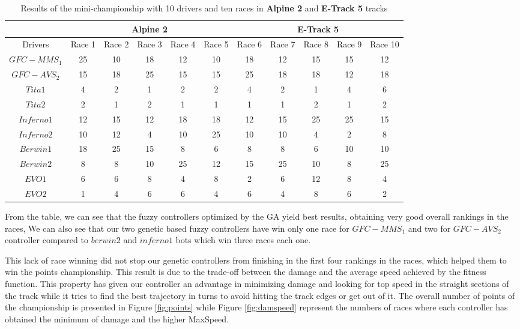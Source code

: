\documentclass[conference]{IEEEtran}
\begin{document}
\begin{table}[ht]
  \centering
  {\scriptsize
    \caption{ Results of the mini-championship with 10 drivers and ten races in \textbf{Alpine 2} and \textbf{E-Track 5} tracks }
    {
			\begin{tabular}{|c||c|c|c|c|c|c|c|c|c|c||}
				\hline
			&\multicolumn{5}{|c|}{\textbf{Alpine 2}} &	\multicolumn{5}{|c|}{\textbf{E-Track 5}}\\
				\hline
				\hline	
				Drivers&{Race 1}&{Race 2}&{Race 3}&{Race 4}&{Race 5}&{Race 6}&{Race 7}&{Race 8}&{Race 9}&{Race 10}\\
				\hline	\hline			
				$GFC-MMS_1$&	25&	10&	18&	12&	10&	18&	12&	15&	15&	12\\
				$GFC-AVS_2$&	15&	18&	25&	15&	15&	25&	18&	18&	12&18\\
				$Tita1$&	4&	2&	1&	2&	2&	4&	2&	1&	4&	6\\
				$Tita2$&	2&	1&	2&	1&	1&	1&	1&	2&	1&	2\\
				$Inferno1$&12&15&	12&	18&	18&	12&	15&	25&	25&	15\\
				$Inferno2$&10&12&	4&	10&	25&	10&	10&	4&	2&	8\\
				$Berwin1$&	18&	25&	15&	8&	6&	8&	8&	6&	10&	10\\
				$Berwin2$	&8&	8&	10&	25&	12&	15&	25&	10&	8&	25\\
				$EVO1$&	6&	6&	8&	4&	8&	2&	6&	12&	8&	4\\
				$EVO2$&	1&	4&	6&	6&	4&	6&	4&	8&	6&	2\\
				\hline
				\hline
				
			\end{tabular}
		}\label{tab:chsresults}
	}
\end{table}



From the table, we can see that the fuzzy controllers optimized by the
GA yield best results, obtaining very good overall rankings in the races, We can also see that our two  genetic based fuzzy controllers have win  only one race for 	$GFC-MMS_1$ and two for $GFC-AVS_2$ controller compared to $berwin2 $ and $inferno1$ bots which win three races each one.

This lack of race winning did not stop our genetic controllers from finishing in the first four rankings in the races, which helped them to win the points championship.
This result is due to the trade-off between the damage and the average speed achieved by the fitness function. This property has given our controller an advantage in minimizing damage and looking for top speed in the straight sections of the track while it tries to find the best trajectory in turns to avoid hitting the track edges or get out of it.
The overall number of points of the championship is presented in Figure \ref{fig:points} while Figure \ref{fig:damspeed} represent the numbers of races where each controller has obtained the minimum of damage and the higher MaxSpeed.
\end{document}
